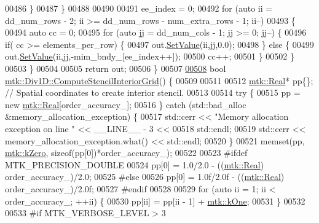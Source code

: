 \begin{DoxyCode}
{{00486     \}
00487   \}
00488 
00490 
00491   ee\_index = 0;
00492   \textcolor{keywordflow}{for} (\textcolor{keyword}{auto} ii = dd\_num\_rows - 2; ii >= dd\_num\_rows - num\_extra\_rows - 1; ii--)
00493   \{
00494     \textcolor{keyword}{auto} cc = 0;
00495     \textcolor{keywordflow}{for} (\textcolor{keyword}{auto} jj = dd\_num\_cols - 1; jj >= 0; jj--) \{
00496       \textcolor{keywordflow}{if}( cc >= elements\_per\_row) \{
00497         out.\hyperlink{classmtk_1_1DenseMatrix_a784ce5784109ac86bfb9d8562b334b13}{SetValue}(ii,jj,0.0);
00498       \} \textcolor{keywordflow}{else} \{
00499         out.\hyperlink{classmtk_1_1DenseMatrix_a784ce5784109ac86bfb9d8562b334b13}{SetValue}(ii,jj,-mim\_bndy\_[ee\_index++]);
00500         cc++;
00501       \}
00502      \}
00503   \}
00504 
00505   \textcolor{keywordflow}{return} out;
00506 \}
00507 
\hypertarget{mtk__div__1d_8cc_source_l00508}{}\hyperlink{classmtk_1_1Div1D_a3eb3a32862a6b066cd583cbbd00a6509}{00508} \textcolor{keywordtype}{bool} \hyperlink{classmtk_1_1Div1D_a3eb3a32862a6b066cd583cbbd00a6509}{mtk::Div1D::ComputeStencilInteriorGrid}() \{
00509 
00511 
00512   \hyperlink{group__c01-roots_gac080bbbf5cbb5502c9f00405f894857d}{mtk::Real}* pp\{\}; \textcolor{comment}{// Spatial coordinates to create interior stencil.}
00513 
00514   \textcolor{keywordflow}{try} \{
00515     pp = \textcolor{keyword}{new} \hyperlink{group__c01-roots_gac080bbbf5cbb5502c9f00405f894857d}{mtk::Real}[order\_accuracy\_];
00516   \} \textcolor{keywordflow}{catch} (std::bad\_alloc &memory\_allocation\_exception) \{
00517     std::cerr << \textcolor{stringliteral}{"Memory allocation exception on line "} << \_\_LINE\_\_ - 3 <<
00518       std::endl;
00519     std::cerr << memory\_allocation\_exception.what() << std::endl;
00520   \}
00521   memset(pp, \hyperlink{group__c01-roots_ga59a451a5fae30d59649bcda274fea271}{mtk::kZero}, \textcolor{keyword}{sizeof}(pp[0])*order\_accuracy\_);
00522 
00523 \textcolor{preprocessor}{  #ifdef MTK\_PRECISION\_DOUBLE}
00524   pp[0] = 1.0/2.0 - ((\hyperlink{group__c01-roots_gac080bbbf5cbb5502c9f00405f894857d}{mtk::Real}) order\_accuracy\_)/2.0;
00525 \textcolor{preprocessor}{  #else}
00526   pp[0] = 1.0f/2.0f - ((\hyperlink{group__c01-roots_gac080bbbf5cbb5502c9f00405f894857d}{mtk::Real}) order\_accuracy\_)/2.0f;
00527 \textcolor{preprocessor}{  #endif}
00528 
00529   \textcolor{keywordflow}{for} (\textcolor{keyword}{auto} ii = 1; ii < order\_accuracy\_; ++ii) \{
00530     pp[ii] = pp[ii - 1] + \hyperlink{group__c01-roots_ga26407c24d43b6b95480943340d285c71}{mtk::kOne};
00531   \}
00532 
00533 \textcolor{preprocessor}{  #if MTK\_VERBOSE\_LEVEL > 3}
}}
\end{DoxyCode}
